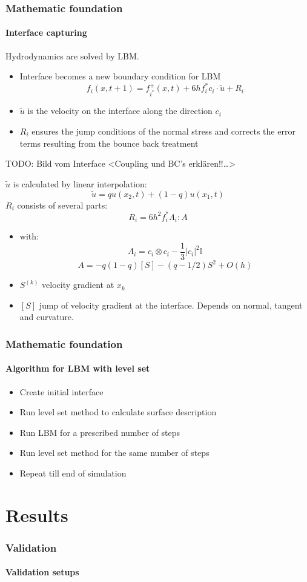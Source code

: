 \documentclass[ucs]{beamer}
\begin{document}
\begin{frame}
\frametitle{Mathematic foundation}
\framesubtitle{Interface capturing}
Hydrodynamics are solved by LBM.
\begin{itemize}
\item<1-> Interface becomes a new boundary condition for LBM
$$f_i(x,t+1) = f_{i^*}^{+}(x,t) + 6hf_{i}^{*}c_i \cdot \tilde{u} + R_i$$
\item<2-> $\tilde{u}$ is the velocity on the interface along the direction $c_i$
\item<3-> $R_i$ ensures the jump conditions of the normal stress and corrects the error terms resulting from the bounce back treatment
\end{itemize}
TODO: Bild vom Interface
<Coupling und BC's erklären!!\ldots>
\end{frame}

\begin{frame}
$\tilde{u}$ is calculated by linear interpolation:
$$\tilde{u} = q u (x_2,t) + (1-q) u(x_1,t)$$
$R_i$ consists of several parts:
$$R_i = 6 h^2 f_{i}^{*} {\Lambda}_i : A$$
\begin{itemize}
\item<1-> with:
$$ {\Lambda}_i = c_i \otimes c_i - \frac13 {|c_i|}^2 \mathbb{I}$$
$$ A = -q(1-q)[S] - (q - 1/2) S^{2} + O(h)$$
\item<2-> $S^{(k)}$ velocity gradient at $x_k$
\item<3-> $[S]$ jump of velocity gradient at the interface. Depends on normal, tangent and curvature.
\end{itemize}
\end{frame}

\begin{frame}
\frametitle{Mathematic foundation}
\framesubtitle{Algorithm for LBM with level set}
\begin{itemize}
\item<1-> Create initial interface
\item<2-> Run level set method to calculate surface description
\item<3-> Run LBM for a prescribed number of steps
\item<4-> Run level set method for the same number of steps
\item<5-> Repeat till end of simulation
\end{itemize}
\end{frame}

\section{Results}
\begin{frame}
\frametitle{Validation}
\framesubtitle{Validation setups}
\end{frame}
\end{document}
